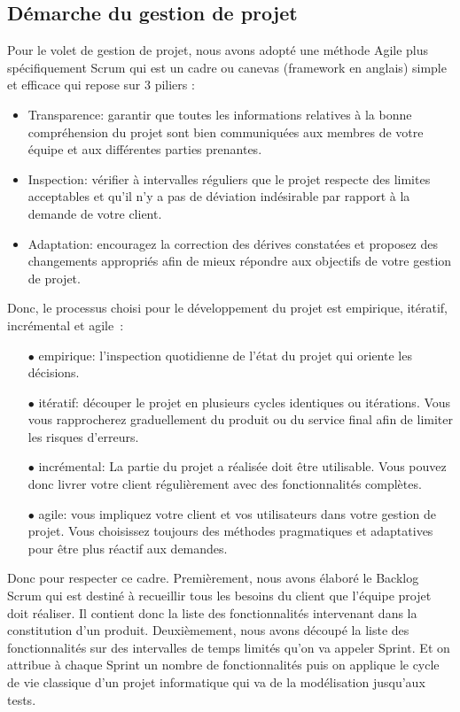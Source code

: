 \subsection{Démarche du gestion de projet} %
\label{sub:démarche_du_gestion_de_projet}
Pour le volet de gestion de projet, nous avons adopté une méthode Agile plus spécifiquement Scrum qui est un cadre ou canevas (framework en anglais)\cite{pilierscrum} simple et efficace qui repose sur 3 piliers :
\begin{itemize}
	\item Transparence: garantir que toutes les informations relatives à la bonne compréhension du projet sont bien communiquées aux membres de votre équipe et aux différentes parties prenantes.
	\item Inspection: vérifier à intervalles réguliers que le projet respecte des limites acceptables et qu’il n’y a pas de déviation indésirable par rapport à la demande de votre client.
	\item Adaptation: encouragez la correction des dérives constatées et proposez des changements appropriés afin de mieux répondre aux objectifs de votre gestion de projet.
\end{itemize}
Donc, le processus choisi pour le développement du projet est empirique, itératif, incrémental et agile : 
\begin{itemize}
	\item[$\bullet$] empirique: l'inspection quotidienne de l'état du projet qui oriente les décisions.
	\item[$\bullet$] itératif: découper le projet en plusieurs cycles identiques ou itérations. Vous vous rapprocherez graduellement du produit ou du service final afin de limiter les risques d'erreurs.
	\item[$\bullet$] incrémental: La partie du projet a réalisée doit être utilisable. Vous pouvez donc livrer votre client régulièrement avec des fonctionnalités complètes.
	\item[$\bullet$] agile: vous impliquez votre client et vos utilisateurs dans votre gestion de projet. Vous choisissez toujours des méthodes pragmatiques et adaptatives pour être plus réactif aux demandes.
\end{itemize}
Donc pour respecter ce cadre. Premièrement, nous avons élaboré le Backlog Scrum qui est destiné à recueillir tous les besoins du client que l'équipe projet doit réaliser. Il contient donc la liste des fonctionnalités intervenant dans la constitution d'un produit.
Deuxièmement, nous avons découpé la liste des fonctionnalités sur des intervalles de temps limités qu'on va appeler Sprint. Et on attribue à chaque Sprint un nombre de fonctionnalités puis on applique le cycle de vie classique d'un projet informatique qui va de la modélisation jusqu'aux tests.\newline
{}

